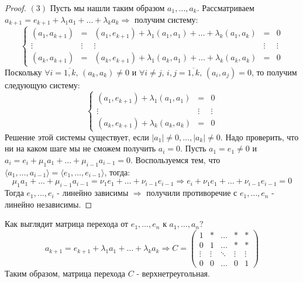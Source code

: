 \documentclass[12pt]{article}
\theoremstyle{definition}
\begin{document}
\begin{proof}
	$(3)$ Пусть мы нашли таким образом $a_1, \dotsc, a_k$. Рассматриваем $a_{k+1} = e_{k+1} + \lambda_1 a_1 + \dotsc + \lambda_k a_k \Rightarrow$ получим систему:
	$$
		\left\{\begin{array}{ccccc}
			(a_1,a_{k+1}) & = & (a_1, e_{k+1}) + \lambda_1(a_1,a_1) + \dotsc + \lambda_k(a_1,a_k) & = & 0\\
			\vdots & \vdots & \vdots & \vdots & \vdots\\
			(a_k,a_{k+1}) & = & (a_k, e_{k+1}) + \lambda_1(a_k,a_1) + \dotsc + \lambda_k(a_k,a_k) & = & 0
		\end{array}\right.
	$$
	Поскольку $\forall i = \overline{1,k}, \, (a_k,a_k) \neq 0$ и $\forall i \neq j, \, i,j = \overline{1,k}, \, (a_i,a_j) = 0$, то получим следующую систему:
	$$
		\left\{\begin{array}{ccc}
			(a_1, e_{k+1}) + \lambda_1(a_1,a_1)  & = & 0\\
			\vdots & \vdots & \vdots\\
			(a_k, e_{k+1}) + \lambda_k(a_k,a_k) & = & 0
		\end{array}\right.	
	$$
	Решение этой системы существует, если $|a_1| \neq 0, \dotsc, |a_k| \neq 0$. Надо проверить, что ни на каком шаге мы не сможем получить $a_i = 0$. Пусть $a_1 = e_1 \neq 0$ и $a_i = e_i + \mu_1 a_1 + \dotsc + \mu_{i-1}a_{i-1} = 0$. Воспользуемся тем, что $\langle a_1, \dotsc, a_{i-1} \rangle = \langle e_1, \dotsc, e_{i-1} \rangle$, тогда:
	$$
		\mu_1 a_1 + \dotsc + \mu_{i-1}a_{i-1} = \nu_1 e_1 + \dotsc + \nu_{i-1}e_{i-1} \Rightarrow e_i + \nu_1 e_1 + \dotsc + \nu_{i-1}e_{i-1} = 0 
	$$
	Тогда $e_1, \dotsc, e_i$ - линейно зависимы $\Rightarrow$ получили противоречие с $e_1, \dotsc, e_n$ - линейно независимы.
\end{proof}

Как выглядит матрица перехода от $e_1,\dotsc, e_n$ к $a_1, \dotsc, a_n$?
$$
	a_{k+1} = e_{k+1} + \lambda_1 a_1 + \dotsc + \lambda_k a_k \Rightarrow C = \begin{pmatrix}
		1 & * & \dotsc & * & *\\
		0 & 1 & \dotsc & * & * \\
		\vdots & \vdots & \ddots & \vdots & \vdots\\
		0 & 0 & \dotsc & 0 & 1 
	\end{pmatrix}
$$
Таким образом, матрица перехода $C$ - верхнетреугольная. 
\end{document}
